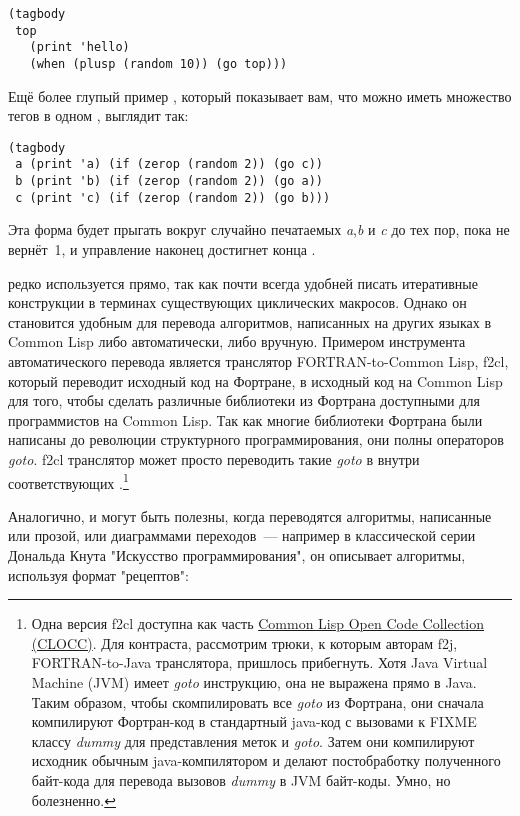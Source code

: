 \begin{lstlisting}
(tagbody
 top
   (print 'hello)
   (when (plusp (random 10)) (go top)))
\end{lstlisting}

Ещё более глупый пример , который показывает вам, что можно иметь множество
тегов в одном , выглядит так:

\begin{lstlisting}
(tagbody
 a (print 'a) (if (zerop (random 2)) (go c))
 b (print 'b) (if (zerop (random 2)) (go a))
 c (print 'c) (if (zerop (random 2)) (go b)))
\end{lstlisting}

Эта форма будет прыгать вокруг случайно печатаемых \textit{a},\textit{b} и \textit{c} до
тех пор, пока  не вернёт~1, и управление наконец достигнет конца
.

 редко используется прямо, так как почти всегда удобней писать итеративные
конструкции в терминах существующих циклических макросов. Однако он становится удобным для
перевода алгоритмов, написанных на других языках в Common Lisp либо автоматически, либо
вручную. Примером инструмента автоматического перевода является транслятор
FORTRAN-to-Common Lisp, f2cl, который переводит исходный код на Фортране, в исходный код
на Common Lisp для того, чтобы сделать различные библиотеки из Фортрана доступными для
программистов на Common Lisp. Так как многие библиотеки Фортрана были написаны до
революции структурного программирования, они полны операторов \textit{goto}. f2cl
транслятор может просто переводить такие \textit{goto} в  внутри соответствующих
.\footnote{Одна версия f2cl доступна как часть
  \href{http://clocc.sourceforge.net/}{Common Lisp Open Code Collection (CLOCC)}. Для
  контраста, рассмотрим трюки, к которым авторам f2j, FORTRAN-to-Java транслятора,
  пришлось прибегнуть. Хотя Java Virtual Machine (JVM) имеет \textit{goto} инструкцию, она
  не выражена прямо в Java. Таким образом, чтобы скомпилировать все \textit{goto} из
  Фортрана, они сначала компилируют Фортран-код в стандартный java-код с вызовами к FIXME
  классу \textit{dummy} для представления меток и \textit{goto}. Затем они компилируют
  исходник обычным java-компилятором и делают постобработку полученного байт-кода для
  перевода вызовов \textit{dummy} в JVM байт-коды. Умно, но болезненно.}

Аналогично,  и  могут быть полезны, когда переводятся алгоритмы, 
написанные или прозой, или диаграммами переходов~--- например в классической серии Дональда 
Кнута "Искусство программирования", он описывает алгоритмы, используя формат "рецептов": 

